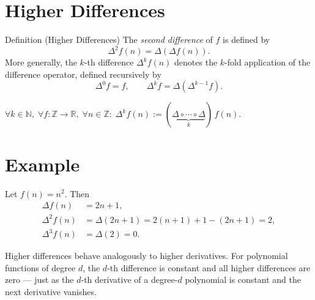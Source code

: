 
\section{Higher Differences}
\label{subsec:higher-differences}

\begin{definitionbox}{Definition (Higher Differences)}
The \emph{second difference} of \(f\) is defined by
\[
\Delta^2 f(n) = \Delta(\Delta f(n)).
\]
More generally, the \(k\)-th difference \(\Delta^k f(n)\) denotes the
\(k\)-fold application of the difference operator, defined recursively by
\[
\Delta^0 f = f, \qquad \Delta^k f = \Delta(\Delta^{k-1} f).
\]
\end{definitionbox}
\label{def:higher-differences}

\begin{remark*}
\(\forall k \in \mathbb{N},\; \forall f : \mathbb{Z}\to\mathbb{R},\;
\forall n \in \mathbb{Z}:\;
\Delta^k f(n) := (\underbrace{\Delta \circ \cdots \circ \Delta}_{k})\,f(n)\).
\end{remark*}

\section*{Example}

Let \(f(n) = n^2\). Then
\[
\begin{aligned}
\Delta f(n) &= 2n + 1,\\
\Delta^2 f(n) &= \Delta(2n+1) = 2(n+1)+1 - (2n+1) = 2,\\
\Delta^3 f(n) &= \Delta(2) = 0.
\end{aligned}
\]

\begin{remark*}
Higher differences behave analogously to higher derivatives.
For polynomial functions of degree \(d\), the \(d\)-th difference is
constant and all higher differences are zero --- just as the \(d\)-th
derivative of a degree-\(d\) polynomial is constant and the next
derivative vanishes.
\end{remark*}
